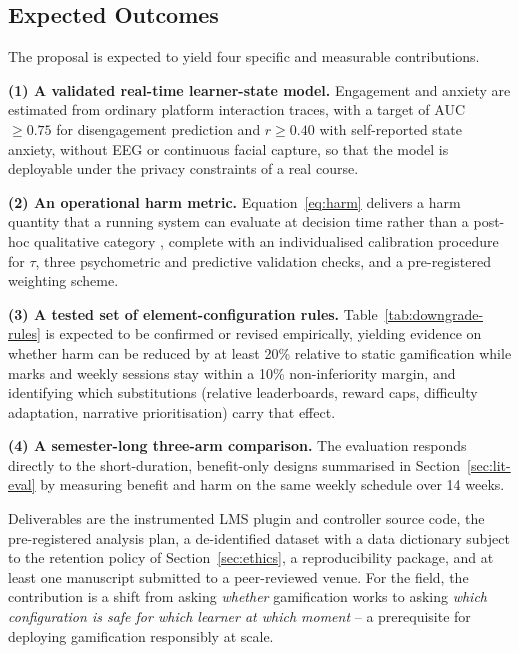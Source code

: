 \documentclass[12pt,a4paper]{article}
\begin{document}
\begin{justify}

\section{Expected Outcomes}


The proposal is expected to yield four specific and measurable contributions.

\textbf{(1) A validated real-time learner-state model.} Engagement and anxiety are estimated from
ordinary platform interaction traces, with a target of AUC $\ge 0.75$ for disengagement prediction
and $r \ge 0.40$ with self-reported state anxiety, without EEG or continuous facial capture, so
that the model is deployable under the privacy constraints of a real course.

\textbf{(2) An operational harm metric.} Equation~\ref{eq:harm} delivers a harm quantity that a
running system can evaluate at decision time rather than a post-hoc qualitative category
\parencite{nugroho2025negative,edwards2022anxiety}, complete with an individualised calibration
procedure for $\tau$, three psychometric and predictive validation checks, and a pre-registered
weighting scheme.

\textbf{(3) A tested set of element-configuration rules.} Table~\ref{tab:downgrade-rules} is
expected to be confirmed or revised empirically, yielding evidence on whether harm can be reduced
by at least 20\% relative to static gamification while marks and weekly sessions stay within a 10\%
non-inferiority margin, and identifying which substitutions (relative leaderboards, reward caps,
difficulty adaptation, narrative prioritisation) carry that effect.

\textbf{(4) A semester-long three-arm comparison.} The evaluation responds directly to the
short-duration, benefit-only designs summarised in Section~\ref{sec:lit-eval} \parencite{lu2024ai,ming2025gamification}
by measuring benefit and harm on the same weekly schedule over 14 weeks.

Deliverables are the instrumented LMS plugin and controller source code, the pre-registered
analysis plan, a de-identified dataset with a data dictionary subject to the retention policy of
Section~\ref{sec:ethics}, a reproducibility package, and at least one manuscript submitted to a peer-reviewed
venue. For the field, the contribution is a shift from asking \emph{whether} gamification works to
asking \emph{which configuration is safe for which learner at which moment} -- a prerequisite for
deploying gamification responsibly at scale.



\end{justify}
\end{document}
